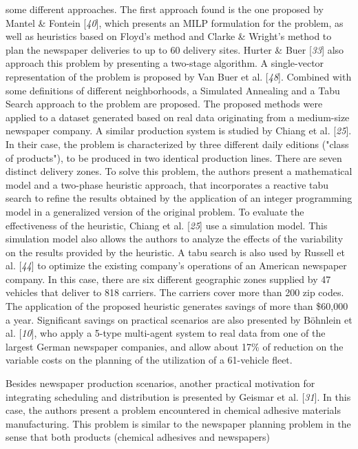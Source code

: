  some different approaches. The first approach found is the one proposed by Mantel
 \& Fontein [\textit{40}], which presents an MILP
 formulation for the problem, as well as heuristics based on Floyd's method and Clarke
 \& Wright's method to plan the newspaper deliveries to up to 60 delivery sites.
 Hurter \& Buer [\textit{33}] also approach this
 problem by presenting a two-stage algorithm. A single-vector representation of the
 problem is proposed by Van Buer et al. [\textit{48}].
 Combined with some definitions of different neighborhoods, a Simulated Annealing and
 a Tabu Search approach to the problem are proposed. The proposed methods were applied
 to a dataset generated based on real data originating from a medium-size newspaper
 company. A similar production system is studied by Chiang et al. [\textit{25}]. In their case, the problem is characterized
 by three different daily editions ("class of products"), to be produced in two
 identical production lines. There are seven distinct delivery zones. To solve this
 problem, the authors present a mathematical model and a two-phase heuristic approach,
 that incorporates a reactive tabu search to refine the results obtained by the
 application of an integer programming model in a generalized version of the original
 problem. To evaluate the effectiveness of the heuristic, Chiang et al. [\textit{25}] use a simulation model. This simulation model
 also allows the authors to analyze the effects of the variability on the results
 provided by the heuristic. A tabu search is also used by Russell et al. [\textit{44}] to optimize the existing company's operations
 of an American newspaper company. In this case, there are six different geographic
 zones supplied by 47 vehicles that deliver to 818 carriers. The carriers cover more
 than 200 zip codes. The application of the proposed heuristic generates savings of
 more than \$60,000 a year. Significant savings on practical scenarios are also
 presented by Böhnlein et al. [\textit{10}], who apply a
 5-type multi-agent system to real data from one of the largest German newspaper
 companies, and allow about 17\% of reduction on the variable costs on the planning of
 the utilization of a 61-vehicle fleet.\par Besides newspaper production scenarios, another practical motivation for integrating
 scheduling and distribution is presented by Geismar et al. [\textit{31}]. In this case, the authors present a problem encountered in
 chemical adhesive materials manufacturing. This problem is similar to the newspaper
 planning problem in the sense that both products (chemical adhesives and newspapers)
